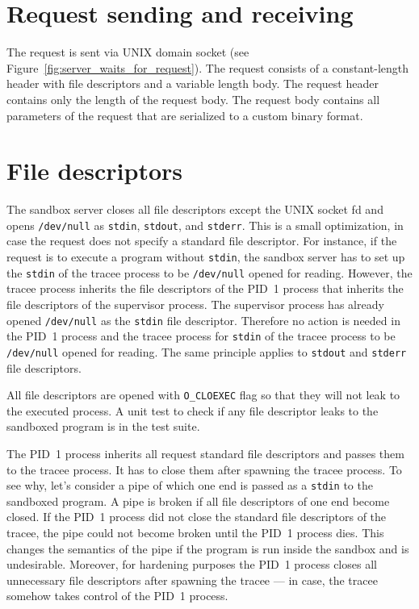 \documentclass[en]{pracamgr}
\begin{document}
\section{Request sending and receiving}

The request is sent via UNIX domain socket (see Figure~\ref{fig:server_waits_for_request}). The request consists of a constant-length header with file descriptors and a variable length body. The request header contains only the length of the request body. The request body contains all parameters of the request that are serialized to a custom binary format.

\section{File descriptors}

The sandbox server closes all file descriptors except the UNIX socket fd and opens \texttt{/dev/null} as \texttt{stdin}, \texttt{stdout}, and \texttt{stderr}. This is a small optimization, in case the request does not specify a standard file descriptor. For instance, if the request is to execute a program without \texttt{stdin}, the sandbox server has to set up the \texttt{stdin} of the tracee process to be \texttt{/dev/null} opened for reading. However, the tracee process inherits the file descriptors of the PID~1 process that inherits the file descriptors of the supervisor process. The supervisor process has already opened \texttt{/dev/null} as the \texttt{stdin} file descriptor. Therefore no action is needed in the PID~1 process and the tracee process for \texttt{stdin} of the tracee process to be \texttt{/dev/null} opened for reading. The same principle applies to \texttt{stdout} and \texttt{stderr} file descriptors.

All file descriptors are opened with \texttt{O\_CLOEXEC} flag so that they will not leak to the executed process. A unit test to check if any file descriptor leaks to the sandboxed program is in the test suite.

The PID~1 process inherits all request standard file descriptors and passes them to the tracee process. It has to close them after spawning the tracee process. To see why, let's consider a pipe of which one end is passed as a \texttt{stdin} to the sandboxed program. A pipe is broken if all file descriptors of one end become closed. If the PID~1 process did not close the standard file descriptors of the tracee, the pipe could not become broken until the PID~1 process dies. This changes the semantics of the pipe if the program is run inside the sandbox and is undesirable. Moreover, for hardening purposes the PID~1 process closes all unnecessary file descriptors after spawning the tracee --- in case, the tracee somehow takes control of the PID~1 process.
\end{document}

